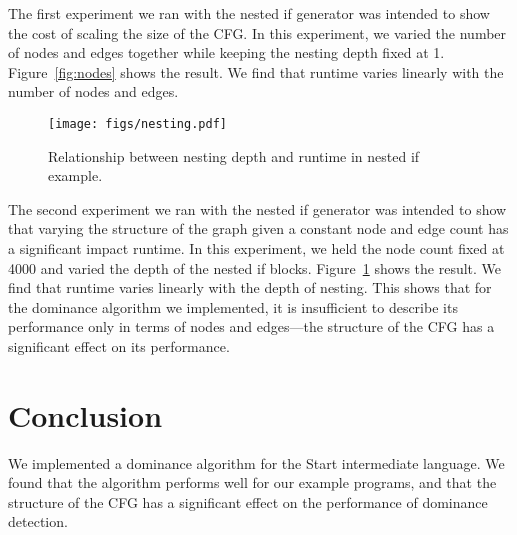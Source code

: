 \documentclass[10pt,twocolumn]{article}
\begin{document}
The first experiment we ran with the nested if generator was intended
to show the cost of scaling the size of the CFG. In this experiment,
we varied the number of nodes and edges together while keeping the
nesting depth fixed at 1. Figure~\ref{fig:nodes} shows the result. We
find that runtime varies linearly with the number of nodes and edges.


\begin{figure}
\begin{center}
  \texttt{[image: figs/nesting.pdf]}
\begin{minipage}{0.95\columnwidth}
  \caption{\label{fig:nesting} Relationship between nesting depth and runtime in nested if example.}
\end{minipage}
\end{center}
\end{figure}

The second experiment we ran with the nested if generator was intended
to show that varying the structure of the graph given a constant node
and edge count has a significant impact runtime. In this experiment,
we held the node count fixed at 4000 and varied the depth of the
nested if blocks. Figure~\ref{fig:nesting} shows the result. We find
that runtime varies linearly with the depth of nesting. This shows
that for the dominance algorithm we implemented, it is insufficient to
describe its performance only in terms of nodes and edges---the
structure of the CFG has a significant effect on its performance.

\section{Conclusion}

We implemented a dominance algorithm for the Start intermediate
language. We found that the algorithm performs well for our example
programs, and that the structure of the CFG has a significant effect
on the performance of dominance detection.



\end{document}
